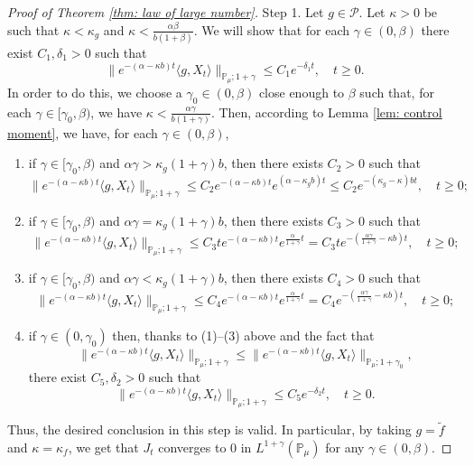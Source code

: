 \documentclass[12pt,a4paper]{amsart}
\theoremstyle{plain}
\theoremstyle{definition}
\numberwithin{equation}{section}
\begin{document}
\begin{proof}[Proof of Theorem \ref{thm: law of large number}]
Step 1. Let $g\in \mathcal P$.
Let $\kappa > 0$ be such that $\kappa < \kappa_g$ and $\kappa < \frac{\alpha \beta}{b(1+\beta)}$.
We will show that for each $\gamma \in (0,\beta)$ there exist $C_1,\delta_1 > 0$ such that
\[
	\|e^{-(\alpha - \kappa b)t} \langle g, X_t\rangle\|_{\mathbb P_\mu;1+\gamma}
	\leq C_1 e^{-\delta_1 t},
	\quad t\geq 0.
\]
In order to do this, we choose a $\gamma_0 \in (0,\beta)$ close enough to $\beta$ such that, for each $\gamma \in [\gamma_0, \beta)$, we have $\kappa < \frac{\alpha\gamma}{b(1+\gamma)}$.
Then, according to Lemma \ref{lem: control moment}, we have, for each $\gamma \in (0,\beta)$,
\begin{enumerate}
\item
	if $\gamma \in [\gamma_0, \beta)$ and $\alpha\gamma> \kappa_g (1+\gamma)b$, then there exists $C_2>0$ such that
  \[
    \|e^{-(\alpha - \kappa b)t} \langle g, X_t\rangle\|_{\mathbb P_\mu;1+\gamma}
    \leq C_2 e^{-(\alpha-\kappa b)t}e^{(\alpha-\kappa_g b)t}
    \leq C_2  e^{-(\kappa_g - \kappa )bt},
    \quad t\geq 0;
  \]
\item
	if $\gamma \in [\gamma_0, \beta)$ and $\alpha\gamma=\kappa_g(1+\gamma)b$, then there exists $C_3>0$ such that
  \[
    \|e^{-(\alpha - \kappa b)t} \langle g, X_t\rangle\|_{\mathbb P_\mu;1+\gamma}
    \leq C_3 t e^{-(\alpha - \kappa b)t}e^{\frac{\alpha}{1+\gamma}t}
    = C_3 t e^{-(\frac{\alpha \gamma}{1+\gamma} - \kappa b)t},
    \quad t\geq 0;
  \]
\item
	if $\gamma \in [\gamma_0, \beta)$ and $\alpha\gamma < \kappa_g (1+\gamma)b$, then there exists $C_4>0$ such that
  \[
    \|e^{-(\alpha - \kappa b)t} \langle g, X_t\rangle\|_{\mathbb{P}_{\mu};1+\gamma}
    \leq C_4  e^{-(\alpha - \kappa b)t}e^{\frac{\alpha}{1+\gamma}t}
    = C_4  e^{-(\frac{\alpha \gamma}{1+\gamma} - \kappa b)t},
    \quad t\geq 0;
  \]
\item
	if $\gamma \in (0,\gamma_0)$ then, thanks to (1)--(3) above and the fact that \[\|e^{-(\alpha - \kappa b)t} \langle g, X_t\rangle\|_{\mathbb{P}_{\mu};1+\gamma}
    \leq \|e^{-(\alpha - \kappa b)t} \langle g, X_t\rangle\|_{\mathbb{P}_{\mu};1+\gamma_0},\] there exist $C_5, \delta_2 >0$ such that
  \[
    \|e^{-(\alpha - \kappa b)t} \langle g, X_t\rangle\|_{\mathbb{P}_{\mu};1+\gamma}
    \leq C_5e^{-\delta_2 t},
    \quad t\geq 0.
  \]
\end{enumerate}
Thus, the desired conclusion in this step is valid.
In particular, by taking $g = \widetilde f$ and $\kappa = \kappa_f$, we get that $J_t$ converges to $0$ in $L^{1+\gamma}(\mathbb{P}_{\mu})$ for any $\gamma\in(0,\beta)$.


\end{proof}
\end{document}

